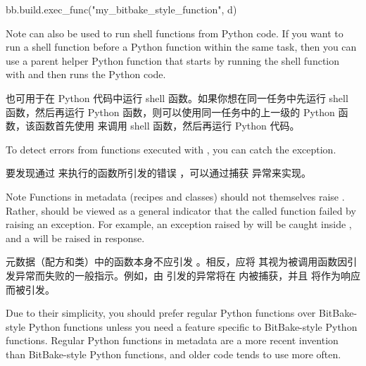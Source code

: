 \begin{itemize}
\begin{pyglist}
bb.build.exec_func("my_bitbake_style_function", d)
\end{pyglist}

\begin{noteblock}{Note}%
 can also be used to run shell functions from Python code. If you want to run a shell function before a Python function within the same task, then you can use a parent helper Python function that starts by running the shell function with  and then runs the Python code.

\medskip
{} 也可用于在 Python 代码中运行 shell 函数。如果你想在同一任务中先运行 shell 函数，然后再运行 Python 函数，则可以使用同一任务中的上一级的 Python 函数，该函数首先使用  来调用 shell 函数，然后再运行 ​​Python 代码。
\end{noteblock}

\medskip
To detect errors from functions executed with , you can catch the  exception.

\medskip
要发现通过  来执行的函数所引发的错误 ，可以通过捕获  异常来实现。

\begin{noteblock}{Note}%
Functions in metadata (recipes and classes) should not themselves raise . Rather,  should be viewed as a general indicator that the called function failed by raising an exception. For example, an exception raised by  will be caught inside , and a  will be raised in response.

\medskip
元数据（配方和类）中的函数本身不应引发 。相反，应将  其视为被调用函数因引发异常而失败的一般指示。例如，由  引发的异常将在  内被捕获，并且 将作为响应而被引发。
\end{noteblock}
\end{itemize}

Due to their simplicity, you should prefer regular Python functions over BitBake-style Python functions unless you need a feature specific to BitBake-style Python functions. Regular Python functions in metadata are a more recent invention than BitBake-style Python functions, and older code tends to use  more often.

